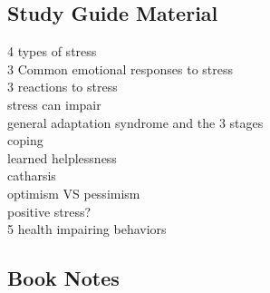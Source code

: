 \documentclass{article}
\begin{document}
\subsection{Study Guide Material}
\begin{description}
    \item [4 types of stress]
    \item [3 Common emotional responses to stress]
    \item [3 reactions to stress]
    \item [stress can impair]
    \item [general adaptation syndrome and the 3 stages]
    \item [coping]
    \item [learned helplessness]
    \item [catharsis]
    \item [optimism VS pessimism]
    \item [positive stress?]
    \item [5 health impairing behaviors]
\end{description}

\subsection{Book Notes}
\end{document}
